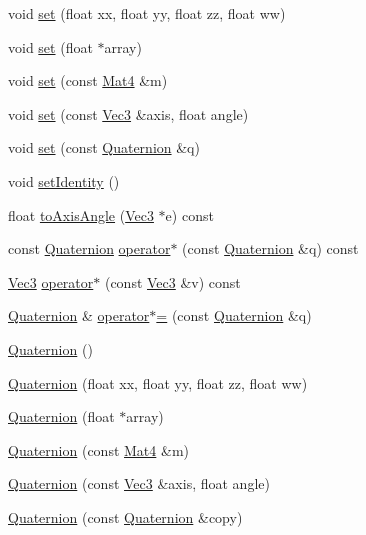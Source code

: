 \begin{DoxyCompactItemize}
\item 
void \hyperlink{classQuaternion_a435e47a2efca1a6c39f1835678437104}{set} (float xx, float yy, float zz, float ww)
\item 
void \hyperlink{classQuaternion_aaf18a418dc62bf348e7629e4875da050}{set} (float $\ast$array)
\item 
void \hyperlink{classQuaternion_ae51fe27416ac31583a4442cc0b8b2252}{set} (const \hyperlink{classMat4}{Mat4} \&m)
\item 
void \hyperlink{classQuaternion_a27ac949226c34a565311aee0a10d61dc}{set} (const \hyperlink{classVec3}{Vec3} \&axis, float angle)
\item 
void \hyperlink{classQuaternion_aebd9c51e5ff6f3d0cc09e61350d33dd3}{set} (const \hyperlink{classQuaternion}{Quaternion} \&q)
\item 
void \hyperlink{classQuaternion_af180a480b5595be969233e728fc4563e}{set\+Identity} ()
\item 
float \hyperlink{classQuaternion_a122b18b294be2543bbc17cc1c7d8e25c}{to\+Axis\+Angle} (\hyperlink{classVec3}{Vec3} $\ast$e) const
\item 
const \hyperlink{classQuaternion}{Quaternion} \hyperlink{classQuaternion_ae1144820c2f61dc0c8ee33060600ca7e}{operator$\ast$} (const \hyperlink{classQuaternion}{Quaternion} \&q) const
\item 
\hyperlink{classVec3}{Vec3} \hyperlink{classQuaternion_a8b63a645c77ec58d1caa6ccb80f51c3b}{operator$\ast$} (const \hyperlink{classVec3}{Vec3} \&v) const
\item 
\hyperlink{classQuaternion}{Quaternion} \& \hyperlink{classQuaternion_a8941e3b43aabd15e2471e57ebd49c8a7}{operator$\ast$=} (const \hyperlink{classQuaternion}{Quaternion} \&q)
\item 
\hyperlink{classQuaternion_abcc01358aada56ea5f0db4da18aaf77d}{Quaternion} ()
\item 
\hyperlink{classQuaternion_a4dcf5b1a3c937b45a0d38ccd4ad6945f}{Quaternion} (float xx, float yy, float zz, float ww)
\item 
\hyperlink{classQuaternion_a27f24bbf6a82546ba6a9fcbb927d882f}{Quaternion} (float $\ast$array)
\item 
\hyperlink{classQuaternion_a190681ee2747fb575ee2dd9ba670981d}{Quaternion} (const \hyperlink{classMat4}{Mat4} \&m)
\item 
\hyperlink{classQuaternion_a58c28df43d7a0624734db4635cb98182}{Quaternion} (const \hyperlink{classVec3}{Vec3} \&axis, float angle)
\item 
\hyperlink{classQuaternion_aea3b87270ed824acf7250b2a94c4af8d}{Quaternion} (const \hyperlink{classQuaternion}{Quaternion} \&copy)

\end{DoxyCompactItemize}
